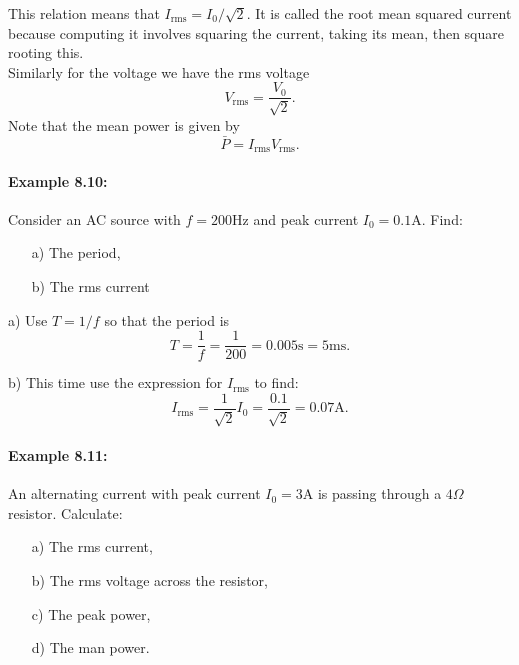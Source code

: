 \documentclass[a4paper,12pt]{book}
\begin{document}
This relation means that $I_{\text{rms}}=I_{0}/\sqrt{2}$. It is called the root mean squared current because computing it involves squaring the current, taking its mean, then square rooting this.\\

Similarly for the voltage we have the rms voltage
\begin{equation*}
V_{\text{rms}}=\frac{V_{0}}{\sqrt{2}}.
\end{equation*}
Note that the mean power is given by
\begin{equation*}
\bar{P}=I_{\text{rms}}V_{\text{rms}}.
\end{equation*}

\paragraph{Example 8.10:} Consider an AC source with $f=200\text{Hz}$ and peak current $I_{0}=0.1\text{A}$. Find:
\begin{itemize}
\setlength{\itemsep}{-5pt}
    \item[a)] The period,
    \item[b)] The rms current
\end{itemize}  

a) Use $T=1/f$ so that the period is
\begin{equation*}
T=\frac{1}{f}=\frac{1}{200}=0.005\text{s}=5\text{ms}.
\end{equation*}

b) This time use the expression for $I_{\text{rms}}$ to find:
\begin{equation*}
I_{\text{rms}}=\frac{1}{\sqrt{2}}I_{0}=\frac{0.1}{\sqrt{2}}=0.07\text{A}.
\end{equation*}

\paragraph{Example 8.11:} An alternating current with peak current $I_{0}=3\text{A}$ is passing through a $4\Omega$ resistor. Calculate:
\begin{itemize}
\setlength{\itemsep}{-5pt}
    \item[a)] The rms current,
    \item[b)] The rms voltage across the resistor,
    \item[c)] The peak power,
    \item[d)] The man power.
\end{itemize}  
\end{document}
